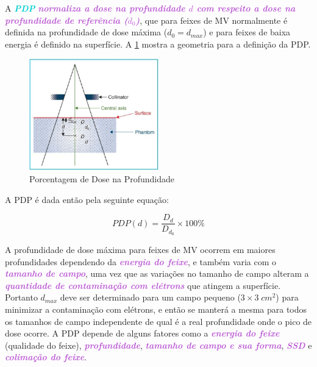 \documentclass[11pt,a4paper]{article}
\begin{document}
	A \textcolor{DarkTurquoise}{\textbf{\textit{PDP}}} \textcolor{MediumOrchid}{\textbf{\textit{normaliza a dose na profundidade $d$ com respeito a dose na profundidade de referência ($d_0$)}}}, que para feixes de MV normalmente é definida na profundidade de dose máxima ($d_0 = d_{max}$) e para feixes de baixa energia é definido na superfície. A \ref{fig:pdp} mostra a geometria para a definição da PDP.

		\begin{figure}[h]
			\centering
			\includegraphics[width=0.5\textwidth]{Imagens/pdp.JPG}
			\caption{Porcentagem de Dose na Profundidade}
			\label{fig:pdp}
		\end{figure}

	A PDP é dada então pela seguinte equação:

		\begin{equation}
			PDP(d) = \frac{D_d}{D_{d_0}} \times 100 \%
		\end{equation}

	
	A profundidade de dose máxima para feixes de MV ocorrem em maiores profundidades dependendo da \textcolor{MediumOrchid}{\textbf{\textit{energia do feixe}}}, e também varia com o \textcolor{MediumOrchid}{\textbf{\textit{tamanho de campo}}}, uma vez que as variações no tamanho de campo alteram a \textcolor{MediumOrchid}{\textbf{\textit{quantidade de contaminação com elétrons}}} que atingem a superfície. Portanto $d_{max}$ deve ser determinado para um campo pequeno ($3 \times 3 \; cm^2$) para minimizar a contaminação com elétrons, e então se manterá a mesma para todos os tamanhos de campo independente de qual é a real profundidade onde o pico de dose ocorre. A PDP depende de alguns fatores como a \textcolor{MediumOrchid}{\textbf{\textit{energia do feixe}}} (qualidade do feixe), \textcolor{MediumOrchid}{\textbf{\textit{profundidade}}}, \textcolor{MediumOrchid}{\textbf{\textit{tamanho de campo e sua forma}}}, \textcolor{MediumOrchid}{\textbf{\textit{SSD}}} e \textcolor{MediumOrchid}{\textbf{\textit{colimação do feixe}}}. 
\end{document}
